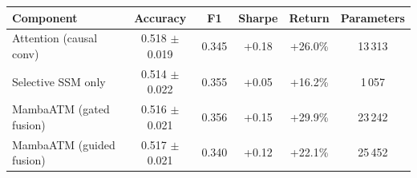 {\scriptsize
\setlength{\tabcolsep}{2pt}
\begin{tabular}{lccccc}
\toprule
\textbf{Component} & \textbf{Accuracy} & \textbf{F1} & \textbf{Sharpe} & \textbf{Return} & \textbf{Parameters} \\
\midrule
Attention (causal conv) & 0.518 $\pm$ 0.019 & 0.345 & +0.18 & +26.0\% & 13\,313 \\
Selective SSM only & 0.514 $\pm$ 0.022 & 0.355 & +0.05 & +16.2\% & 1\,057 \\
MambaATM (gated fusion) & 0.516 $\pm$ 0.021 & 0.356 & +0.15 & +29.9\% & 23\,242 \\
MambaATM (guided fusion) & 0.517 $\pm$ 0.021 & 0.340 & +0.12 & +22.1\% & 25\,452 \\
\bottomrule
\end{tabular}
}
